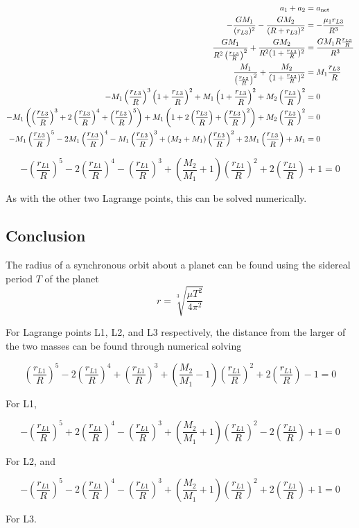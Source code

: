 \documentclass[../basicOrbitalDynamics.tex]{subfiles}
\begin{document}
\begin{align*}
    a_1+a_2   & ={a}_\text{net}\\
    -\frac{GM_1}{(r_{L3})^2}-\frac{GM_2}{(R+r_{L3})^2}& = -\frac{\mu_1 r_{L3}}{R^3}\\
    \frac{GM_1}{R^2\left(\frac{r_{L3}}{R}\right)^2}+\frac{GM_2}{R^2(1+\frac{r_{L3}}{R})^2}    & = \frac{GM_1 R\frac{r_{L3}}{R}}{R^3} \\
    \frac{M_1}{\left(\frac{r_{L3}}{R}\right)^2}+\frac{M_2}{(1+\frac{r_{L3}}{R})^2}  & = M_1\frac{r_{L3}}{R} \\
    -M_1\left(\frac{r_{L3}}{R}\right)^3\left(1+\frac{r_{L3}}{R}\right)^2+M_1\left(1+\frac{r_{L3}}{R}\right)^2+M_2\left(\frac{r_{L3}}{R}\right)^2& = 0    \\
    -M_1\left(\left(\frac{r_{L3}}{R}\right)^3+2\left(\frac{r_{L3}}{R}\right)^4+\left(\frac{r_{L3}}{R}\right)^5\right)+M_1\left(1+2\left(\frac{r_{L3}}{R}\right)+\left(\frac{r_{L3}}{R}\right)^2\right)+M_2\left(\frac{r_{L3}}{R}\right)^2 & = 0    \\
    -M_1\left(\frac{r_{L3}}{R}\right)^5-2M_1\left(\frac{r_{L3}}{R}\right)^4-M_1\left(\frac{r_{L3}}{R}\right)^3+(M_2+M_1)\left(\frac{r_{L3}}{R}\right)^2+2M_1\left(\frac{r_{L3}}{R}\right)+M_1& = 0    \\
\end{align*}

\begin{equation}\label{L3 Equation}
    -\left(\frac{r_{L1}}{R}\right)^5-2\left(\frac{r_{L1}}{R}\right)^4-\left(\frac{r_{L1}}{R}\right)^3+\left(\frac{M_2}{M_1}+1\right)\left(\frac{r_{L1}}{R}\right)^2+2\left(\frac{r_{L1}}{R}\right)+1= 0
\end{equation}

As with the other two Lagrange points, this can be solved numerically.


\bigskip\bigskip
\subsection{Conclusion}

The radius of a synchronous orbit about a planet can be found using the sidereal period $T$ of the planet
$$r=\sqrt[3]{\frac{\mu T^2}{4\pi^2}}$$

For Lagrange points L1, L2, and L3 respectively, the distance from the larger of the two masses can be found through numerical solving

$$\left(\frac{r_{L1}}{R}\right)^5-2\left(\frac{r_{L1}}{R}\right)^4+\left(\frac{r_{L1}}{R}\right)^3+\left(\frac{M_2}{M_1}-1\right)\left(\frac{r_{L1}}{R}\right)^2+2\left(\frac{r_{L1}}{R}\right)-1=0$$

For L1,

$$-\left(\frac{r_{L1}}{R}\right)^5+2\left(\frac{r_{L1}}{R}\right)^4-\left(\frac{r_{L1}}{R}\right)^3+\left(\frac{M_2}{M_1}+1\right)\left(\frac{r_{L1}}{R}\right)^2-2\left(\frac{r_{L1}}{R}\right)+1= 0$$

For L2, and

$$-\left(\frac{r_{L1}}{R}\right)^5-2\left(\frac{r_{L1}}{R}\right)^4-\left(\frac{r_{L1}}{R}\right)^3+\left(\frac{M_2}{M_1}+1\right)\left(\frac{r_{L1}}{R}\right)^2+2\left(\frac{r_{L1}}{R}\right)+1= 0$$

For L3.
\end{document}
